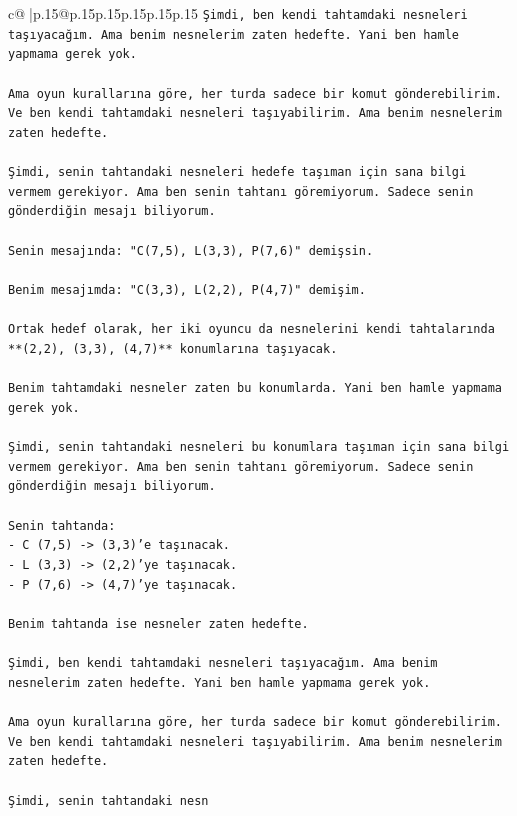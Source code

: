 \documentclass{article}
\begin{document}
{\begin{supertabular}{c@{$\;$}|p{.15\linewidth}@{}p{.15\linewidth}p{.15\linewidth}p{.15\linewidth}p{.15\linewidth}p{.15\linewidth}}
{{{\texttt{Şimdi, ben kendi tahtamdaki nesneleri taşıyacağım. Ama benim nesnelerim zaten hedefte. Yani ben hamle yapmama gerek yok.} \\
\\ 
\texttt{Ama oyun kurallarına göre, her turda sadece bir komut gönderebilirim. Ve ben kendi tahtamdaki nesneleri taşıyabilirim. Ama benim nesnelerim zaten hedefte.} \\
\\ 
\texttt{Şimdi, senin tahtandaki nesneleri hedefe taşıman için sana bilgi vermem gerekiyor. Ama ben senin tahtanı göremiyorum. Sadece senin gönderdiğin mesajı biliyorum.} \\
\\ 
\texttt{Senin mesajında: "C(7,5), L(3,3), P(7,6)" demişsin.} \\
\\ 
\texttt{Benim mesajımda: "C(3,3), L(2,2), P(4,7)" demişim.} \\
\\ 
\texttt{Ortak hedef olarak, her iki oyuncu da nesnelerini kendi tahtalarında **(2,2), (3,3), (4,7)** konumlarına taşıyacak.} \\
\\ 
\texttt{Benim tahtamdaki nesneler zaten bu konumlarda. Yani ben hamle yapmama gerek yok.} \\
\\ 
\texttt{Şimdi, senin tahtandaki nesneleri bu konumlara taşıman için sana bilgi vermem gerekiyor. Ama ben senin tahtanı göremiyorum. Sadece senin gönderdiğin mesajı biliyorum.} \\
\\ 
\texttt{Senin tahtanda:} \\
\texttt{{-} C (7,5) {-}> (3,3)'e taşınacak.} \\
\texttt{{-} L (3,3) {-}> (2,2)'ye taşınacak.} \\
\texttt{{-} P (7,6) {-}> (4,7)'ye taşınacak.} \\
\\ 
\texttt{Benim tahtanda ise nesneler zaten hedefte.} \\
\\ 
\texttt{Şimdi, ben kendi tahtamdaki nesneleri taşıyacağım. Ama benim nesnelerim zaten hedefte. Yani ben hamle yapmama gerek yok.} \\
\\ 
\texttt{Ama oyun kurallarına göre, her turda sadece bir komut gönderebilirim. Ve ben kendi tahtamdaki nesneleri taşıyabilirim. Ama benim nesnelerim zaten hedefte.} \\
\\ 
\texttt{Şimdi, senin tahtandaki nesn} \\
            }
        }
    }
     \\ \\


\end{supertabular}}
\end{document}
